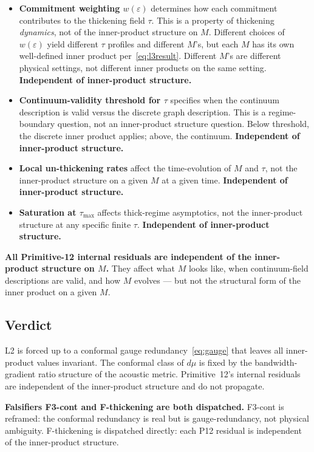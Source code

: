 \documentclass[11pt,a4paper]{article}
\begin{document}
\begin{itemize}
  \item \textbf{Commitment weighting $w(\varepsilon)$} determines how each commitment contributes to the thickening field $\tau$. This is a property of thickening \emph{dynamics}, not of the inner-product structure on $M$. Different choices of $w(\varepsilon)$ yield different $\tau$ profiles and different $M$'s, but each $M$ has its own well-defined inner product per~\eqref{eq:l3result}. Different $M$'s are different physical settings, not different inner products on the same setting. \textbf{Independent of inner-product structure.}
  \item \textbf{Continuum-validity threshold for $\tau$} specifies when the continuum description is valid versus the discrete graph description. This is a regime-boundary question, not an inner-product structure question. Below threshold, the discrete inner product applies; above, the continuum. \textbf{Independent of inner-product structure.}
  \item \textbf{Local un-thickening rates} affect the time-evolution of $M$ and $\tau$, not the inner-product structure on a given $M$ at a given time. \textbf{Independent of inner-product structure.}
  \item \textbf{Saturation at $\tau_\mathrm{max}$} affects thick-regime asymptotics, not the inner-product structure at any specific finite $\tau$. \textbf{Independent of inner-product structure.}
\end{itemize}

\textbf{All Primitive-12 internal residuals are independent of the inner-product structure on $M$.} They affect what $M$ looks like, when continuum-field descriptions are valid, and how $M$ evolves --- but not the structural form of the inner product on a given $M$.

\subsection{Verdict}

L2 is forced up to a conformal gauge redundancy~\eqref{eq:gauge} that leaves all inner-product values invariant. The conformal class of $d\mu$ is fixed by the bandwidth-gradient ratio structure of the acoustic metric. Primitive~12's internal residuals are independent of the inner-product structure and do not propagate.

\textbf{Falsifiers F3-cont and F-thickening are both dispatched.} F3-cont is reframed: the conformal redundancy is real but is gauge-redundancy, not physical ambiguity. F-thickening is dispatched directly: each P12 residual is independent of the inner-product structure.
\end{document}
